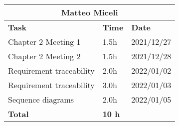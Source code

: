 \begin{table}[H]
\centering
\begin{tabular}{|p{}|p{}|p{}|}
\hline
\multicolumn{3}{|c|}{\textbf{Matteo Miceli}}            \\ \hline
\textbf{Task}                   & \textbf{Time} & \textbf{Date} \\ \hline

Chapter 2 Meeting 1				&		1.5h	   &	2021/12/27 \\ \hline
Chapter 2 Meeting 2				&		1.5h	   &	2021/12/28 \\ \hline
Requirement traceability		&		2.0h	   &	2022/01/02 \\ \hline
Requirement traceability		&		3.0h	   &	2022/01/03 \\ \hline
Sequence diagrams 	&		2.0h	   &	2022/01/05 \\ \hline

\textbf{Total}                  		&  \textbf{10 h}   & \\ \hline
\end{tabular}
\end{table}
